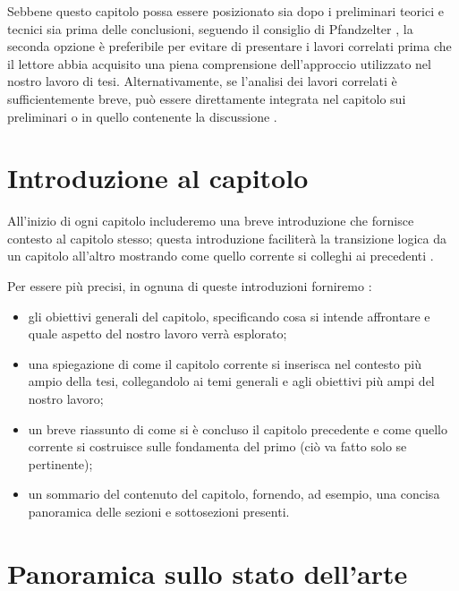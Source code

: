 Sebbene questo capitolo possa essere posizionato sia dopo i preliminari teorici e tecnici sia prima delle conclusioni, seguendo il consiglio di Pfandzelter \etAl \cite{pfandzelter2022thesis}, la seconda opzione è preferibile per evitare di presentare i lavori correlati prima che il lettore abbia acquisito una piena comprensione dell'approccio utilizzato nel nostro lavoro di tesi. Alternativamente, se l'analisi dei lavori correlati è sufficientemente breve, può essere direttamente integrata nel capitolo sui preliminari o in quello contenente la discussione \cite{mannisto2022guide}.

\section{Introduzione al capitolo}

All'inizio di ogni capitolo includeremo una breve introduzione che fornisce contesto al capitolo stesso; questa introduzione faciliterà la transizione logica da un capitolo all'altro mostrando come quello corrente si colleghi ai precedenti \cite{zobel2015writing}.

\medskip

Per essere più precisi, in ognuna di queste introduzioni forniremo \cite{unibz2022thesis}:
\begin{itemize}

\item gli obiettivi generali del capitolo, specificando cosa si intende affrontare e quale aspetto del nostro lavoro verrà esplorato;

\item una spiegazione di come il capitolo corrente si inserisca nel contesto più ampio della tesi, collegandolo ai temi generali e agli obiettivi più ampi del nostro lavoro;

\item un breve riassunto di come si è concluso il capitolo precedente e come quello corrente si costruisce sulle fondamenta del primo (ciò va fatto solo se pertinente);

\item un sommario del contenuto del capitolo, fornendo, ad esempio, una concisa panoramica delle sezioni e sottosezioni presenti.

\end{itemize}

\section{Panoramica sullo stato dell'arte}

